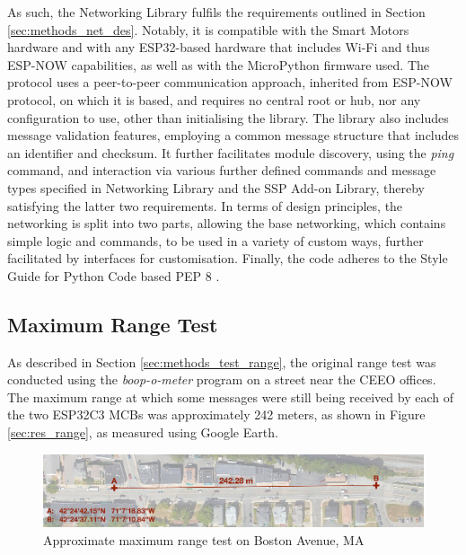
As such, the Networking Library fulfils the requirements outlined in Section \ref{sec:methods_net_des}. Notably, it is compatible with the Smart Motors hardware and with any ESP32-based hardware that includes Wi-Fi and thus ESP-NOW capabilities, as well as with the MicroPython firmware used. The protocol uses a peer-to-peer communication approach, inherited from ESP-NOW protocol, on which it is based, and requires no central root or hub, nor any configuration to use, other than initialising the library. The library also includes message validation features, employing a common message structure that includes an identifier and checksum. It further facilitates module discovery, using the \textit{ping} command, and interaction via various further defined commands and message types specified in Networking Library and the SSP Add-on Library, thereby satisfying the latter two requirements. In terms of design principles, the networking is split into two parts, allowing the base networking, which contains simple logic and commands, to be used in a variety of custom ways, further facilitated by interfaces for customisation. Finally, the code adheres to the Style Guide for Python Code based PEP 8 \citep{rossum_python_2001}.

\subsection{\label{sec:res_range}Maximum Range Test}

As described in Section \ref{sec:methods_test_range}, the original range test was conducted using the \textit{boop-o-meter} program on a street near the CEEO offices. The maximum range at which some messages were still being received by each of the two ESP32C3 MCBs was approximately 242 meters, as shown in Figure \ref{sec:res_range}, as measured using Google Earth.

\begin{figure}[H]
    \centering
    \includegraphics[width=\linewidth]{overleaf/images/range2.png}
    \vspace{.5\ftspace}
    \caption{Approximate maximum range test on Boston Avenue, MA}
    \label{fig:range}
\end{figure}


